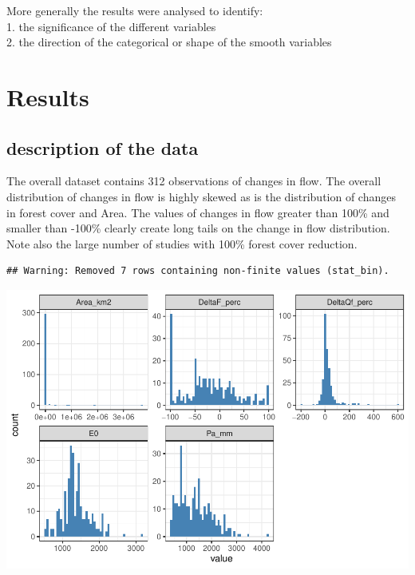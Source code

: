 \documentclass[]{elsarticle} %
\begin{document}
More generally the results were analysed to identify:\\
1. the significance of the different variables\\
2. the direction of the categorical or shape of the smooth variables

\hypertarget{results}{%
\section{Results}\label{results}}

\hypertarget{description-of-the-data}{%
\subsection{description of the data}\label{description-of-the-data}}

The overall dataset contains 312 observations of changes in flow. The
overall distribution of changes in flow is highly skewed as is the
distribution of changes in forest cover and Area. The values of changes
in flow greater than 100\% and smaller than -100\% clearly create long
tails on the change in flow distribution. Note also the large number of
studies with 100\% forest cover reduction.

\begin{verbatim}
## Warning: Removed 7 rows containing non-finite values (stat_bin).
\end{verbatim}

\includegraphics{Forest_and_Water_files/figure-latex/unnamed-chunk-8-1.pdf}
\end{document}

